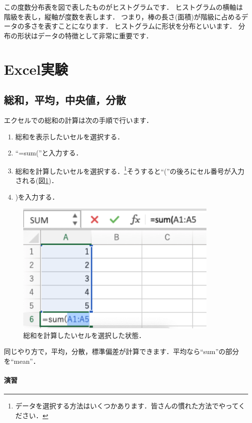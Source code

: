 \documentclass[12pt, a4j]{jreport}
\begin{document}
この度数分布表を図で表したものがヒストグラムです．
ヒストグラムの横軸は階級を表し，縦軸が度数を表します．
つまり，棒の長さ(面積)が階級に占めるデータの多さを表すことになります．
ヒストグラムに形状を分布といいます．
分布の形状はデータの特徴として非常に重要です．

\section{Excel実験}

\subsection{総和，平均，中央値，分散}

エクセルでの総和の計算は次の手順で行います．

\begin{enumerate}
    \item 総和を表示したいセルを選択する．
    \item ``=sum(''と入力する．
    \item 総和を計算したいセルを選択する．\footnote{データを選択する方法はいくつかあります．皆さんの慣れた方法でやってください．}そうすると``(''の後ろにセル番号が入力される(図\ref{fig:sum})．
    \item )を入力する．
\end{enumerate}

\begin{figure}[htbp]
  \includegraphics[width=10cm]{sum.png}
  \caption{総和を計算したいセルを選択した状態．}
  \label{fig:sum}
\end{figure}

同じやり方で，平均，分散，標準偏差が計算できます．平均なら``sum''の部分を``mean''．

\paragraph{演習}
\end{document}
